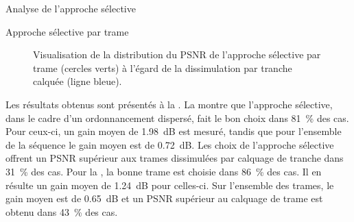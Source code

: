 \begin{section}{Analyse de l'approche sélective}
\begin{subsection}{Approche sélective par trame}
\begin{figure}
	\caption[PSNR de l'approche sélective par trame]{Visualisation de la
distribution du PSNR de l'approche sélective par trame (cercles verts) à l'égard
de la dissimulation par tranche calquée (ligne bleue).}
	\label{fig-SelectiveSliceCopy}
\end{figure}

Les résultats obtenus sont présentés à la . La
 montre que l'approche sélective, dans le cadre d'un
ordonnancement dispersé, fait le bon choix dans 81~\% des cas. Pour ceux-ci, un
gain moyen de 1.98~dB est mesuré, tandis que pour l'ensemble de la séquence le
gain moyen est de 0.72~dB. Les choix de l'approche sélective offrent un PSNR
supérieur aux trames dissimulées par calquage de tranche dans 31~\% des cas.
Pour la , la bonne trame est choisie dans 86~\%
des cas. Il en résulte un gain moyen de 1.24~dB pour celles-ci. Sur l'ensemble
des trames, le gain moyen est de 0.65~dB et un PSNR supérieur au calquage de
trame est obtenu dans 43~\% des cas.


\end{subsection}
\end{section}
